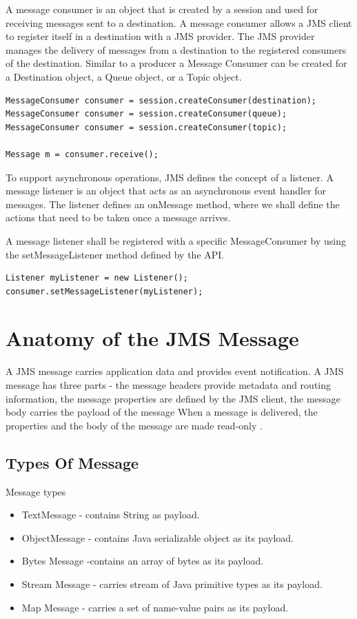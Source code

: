 \documentclass[9pt,twocolumn,twoside]{styles/osajnl}
\begin{document}
A message consumer is an object that is created by a session and used
for receiving messages sent to a destination.  A message consumer
allows a JMS client to register itself in a destination with a JMS
provider. The JMS provider manages the delivery of messages from a
destination to the registered consumers of the destination.  Similar
to a producer a Message Consumer can be created for a Destination
object, a Queue object, or a Topic object.

\begin{lstlisting}
MessageConsumer consumer = session.createConsumer(destination);
MessageConsumer consumer = session.createConsumer(queue);
MessageConsumer consumer = session.createConsumer(topic);

Message m = consumer.receive();
\end{lstlisting}

To support asynchronous operations, JMS defines the concept of a
listener.  A message listener is an object that acts as an
asynchronous event handler for messages. The listener defines an
onMessage method, where we shall define the actions that need to be
taken once a message arrives.

A message listener shall be registered with a specific MessageConsumer
by using the setMessageListener method defined by the API.

\begin{lstlisting}
Listener myListener = new Listener();
consumer.setMessageListener(myListener);
\end{lstlisting}

\section{Anatomy of the JMS Message}


A JMS message carries application data and provides event
notification.  A JMS message has three parts - the message headers
provide metadata and routing information, the message properties are
defined by the JMS client, the message body carries the payload of the
message When a message is delivered, the properties and the body of
the message are made read-only \cite{www-jms-fischli-article}.

\subsection{Types Of Message}

Message types
\begin{itemize}
\item TextMessage - contains String as payload.
\item ObjectMessage - contains Java serializable object as its payload.
\item Bytes Message -contains an array of bytes as its payload.
\item Stream Message - carries stream of Java primitive types as its payload.
\item Map Message - carries a set of name-value pairs as its payload.
\end{itemize}
\end{document}
